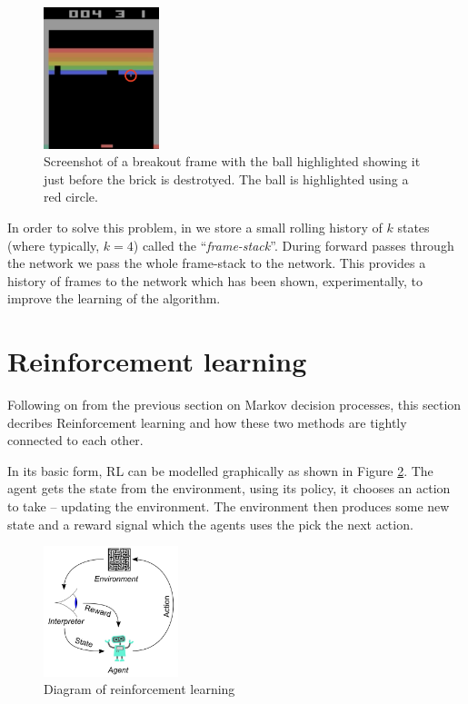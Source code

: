 \begin{figure}[htbp]
	\centering
	\includegraphics[width=0.30\textwidth]{chapters/chapter3/images/breakout.png}
	\caption[Screenshot of single breakout frame]{Screenshot of a breakout frame with the ball highlighted showing it just before the brick is destrotyed. The ball is highlighted using a red circle.
		\label{fig:breakout-brick-fig}
	}
\end{figure}

In order to solve this problem, in we store a small rolling history of $k$ states (where typically, $k = 4$) called the ``\textit{frame-stack}''. During forward passes through the network we pass the whole frame-stack to the network. This provides a history of frames to the network which has been shown, experimentally, to improve the learning of the algorithm.

\section{Reinforcement learning}
\label{dsgn:sec:rl}
Following on from the previous section on Markov decision processes, this section decribes Reinforcement learning and how these two methods are tightly connected to each other.

In its basic form, RL can be modelled graphically as shown in Figure \ref{fig:rl-diagram}. The agent gets the state from the environment, using its policy, it chooses an action to take -- updating the environment. The environment then produces some new state and a reward signal which the agents uses the pick the next action.

\begin{figure}[htbp]
	\centering
	\includegraphics[width=0.35\textwidth]{chapters/chapter3/images/rl.jpg}
	\caption{Diagram of reinforcement learning
		\label{fig:rl-diagram}
	}
\end{figure}

